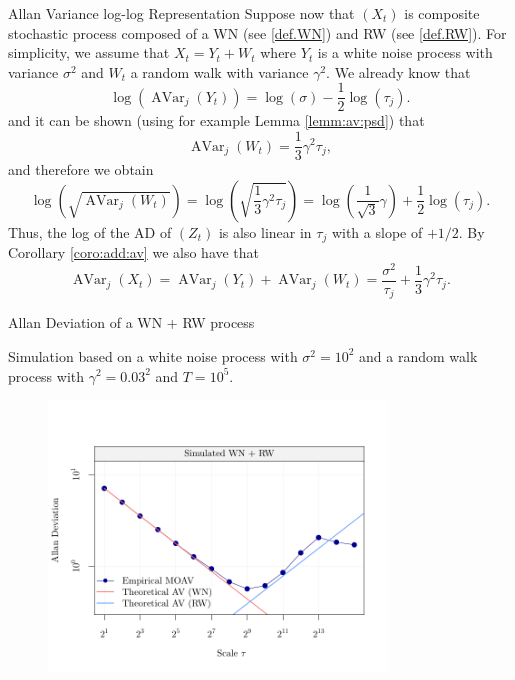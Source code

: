 \documentclass[envcountsect,usenames,dvipsnames]{beamer}
\DeclareMathOperator{\AV}{AVar}
\theoremstyle{mystyle}
\begin{document}
\begin{frame}{Allan Variance log-log Representation}
\footnotesize
    Suppose now that $(X_t)$ is composite stochastic process composed of a WN (see \ref{def.WN}) and RW (see \ref{def.RW}). For simplicity, we assume that $X_t = Y_t + W_t$ where $Y_t$ is a white noise process with variance $\sigma^2$ and $W_t$ a random walk with variance $\gamma^2$. We already know that
    \begin{equation*}
       \log\left( \AV_j(Y_t)  \right) = \log \left(\sigma\right) - \frac{1}{2} \log (\tau_j).
    \end{equation*}
    and it can be shown (using for example Lemma \ref{lemm:av:psd}) that
    \begin{equation*}
        \AV_j(W_t) = \frac{1}{3} \gamma^2 \tau_j,
    \end{equation*}
    and therefore we obtain
    \begin{equation*}
       \log\left( \sqrt{\AV_j(W_t) } \right) = \log \left(\sqrt{\frac{1}{3} \gamma^2 \tau_j}\right) = \log \left(\frac{1}{\sqrt{3}} \gamma\right) + \frac{1}{2} \log (\tau_j).
    \end{equation*}
    Thus, the log of the AD of $(Z_t)$ is also linear in $\tau_j$ with a slope of $+1/2$. By Corollary \ref{coro:add:av} we also have that
    \begin{equation}
        \AV_j(X_t) = \AV_j(Y_t) + \AV_j(W_t) =  \frac{\sigma^2}{\tau_j} + \frac{1}{3} \gamma^2 \tau_j.
        \label{eq:av:wn:rw}
    \end{equation}   
\end{frame}


\begin{frame}{Allan Deviation of a WN + RW process}
    \begin{block}{ }
    Simulation based on a white noise process with $\sigma^2 = 10^2$ and a random walk process with $\gamma^2 = 0.03^2$ and $T = 10^5$.
    \end{block}
    
    \vspace{-1cm}
\begin{figure}
	    \centering
	  \includegraphics[width = 9cm]{Images/av_example_wnrw.pdf}
	\end{figure}
	
\end{frame}
\end{document}
